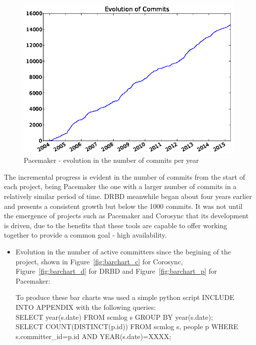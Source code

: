 \documentclass[a4paper, 12pt]{book}
\begin{document}
    \begin{figure}[H]
      \centering
      \includegraphics[scale=0.45]{fig8-6.png}
      \caption[Evolution in the number of commits for Pacemaker]{Pacemaker - evolution in the number of commits per year}
      \label{fig:fig8-6}
    \end{figure}

    
\noindent The incremental progress is evident in the number of commits from the start of each project, being Pacemaker the one with a larger number of commits in a relatively similar period of time. DRBD meanwhile began about four years earlier and presents a consistent growth but below the 1000 commits. It was not until the emergence of projects such as Pacemaker and Corosync that its development is driven, due to the benefits that these tools are capable to offer working together to provide a common goal - high availability.


\begin{itemize}
      \item Evolution in the number of active committers since the begining of the project, shown in Figure~\ref{fig:barchart_c} for Corosync, Figure~\ref{fig:barchart_d} for DRBD and Figure~\ref{fig:barchart_p} for Pacemaker:

      To produce these bar charts was used a simple python script {INCLUDE INTO APPENDIX} with the following queries:\\
      SELECT year(s.date) FROM scmlog s GROUP BY year(s.date);\\
      SELECT COUNT(DISTINCT(p.id)) FROM scmlog s, people p WHERE s.committer\_id=p.id AND YEAR(s.date)=XXXX;
\end{itemize}
\end{document}
